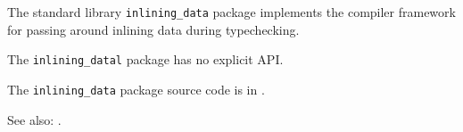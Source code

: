 
The standard library {\tt inlining\_data} package implements the 
compiler framework for passing around inlining data during typechecking.

The {\tt inlining\_datal} package has no explicit API.

The {\tt inlining\_data} package source code is in .

See also:  .




